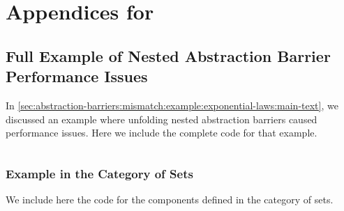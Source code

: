 \chapter{Appendices for }\label{ch:appendix:perf-failures}
\section{Full Example of Nested Abstraction Barrier Performance Issues}\label{sec:abstraction-barriers:mismatch:example:exponential-laws:full-code}

In \autoref{sec:abstraction-barriers:mismatch:example:exponential-laws:main-text}, we discussed an example where unfolding nested abstraction barriers caused performance issues.
Here we include the complete code for that example.


\inputminted{coq}{fragments/CategoryExponentialLaws.v}


\subsection{Example in the Category of Sets}\label{sec:abstraction-barriers:mismatch:example:exponential-laws:full-code:sets}

We include here the code for the components defined in the category of sets.

\inputminted{coq}{fragments/CategoryExponentialLawsSet.v}
